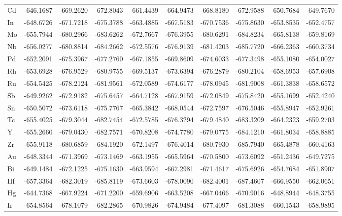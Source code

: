 \begin{table}[h]
{\begin{tabular}{*{10}{l}}
      Cd	& -646.1687	&-669.2620  &-672.8043	&-661.4439	&-664.9473	&-668.8180  &-672.9588	&-650.7684	&-649.7670 \\
      In	& -648.6726	&-671.7218	&-675.3788	&-663.4885	&-667.5183	&-670.7536	&-675.8630  &-653.8535	&-652.4757 \\
      Mo	& -655.7944	&-680.2966	&-683.6262	&-672.7667	&-676.3955	&-680.6291	&-684.8234	&-665.8138	&-659.8169 \\
      Nb	& -656.0277	&-680.8814	&-684.2662	&-672.5576	&-676.9139	&-681.4203	&-685.7720  &-666.2363	&-660.3734 \\
      Pd	& -652.2091	&-675.3967	&-677.2760  &-667.1855	&-669.8609	&-674.6033	&-677.3498	&-655.1080  &-654.0027 \\
      Rh	& -653.6928	&-676.9529	&-680.9755	&-669.5137	&-673.6394	&-676.2879	&-680.2104	&-658.6953	&-657.6908 \\
      Ru	& -654.5425	&-678.2124	&-681.9561	&-672.0589	&-674.6177	&-678.0945	&-681.9008	&-661.3838	&-658.6572 \\
      Sb	& -649.9262	&-672.9182	&-675.6457	&-664.7128	&-667.9159	&-672.0849	&-675.8420 	&-655.1699	&-652.4240 \\
      Sn	& -650.5072	&-673.6118	&-675.7767	&-665.3842	&-668.0544	&-672.7597	&-676.5046	&-655.8947	&-652.9261 \\
      Tc	& -655.4025	&-679.3044	&-682.7454	&-672.5785	&-676.3294	&-679.4840  &-683.3209	&-664.2323	&-659.2703 \\
      Y	  & -655.2660 &-679.0430	&-682.7571	&-670.8208	&-674.7780  &-679.0775	&-684.1210  &-661.8034	&-658.8885 \\
      Zr	& -655.9118	&-680.6859	&-684.1920  &-672.1497	&-676.4014	&-680.7930  &-685.7940  &-665.4878	&-660.4163 \\
      Au	& -648.3344	&-671.3969	&-673.1469	&-663.1955	&-665.5964	&-670.5800	&-673.6092	&-651.2436	&-649.7275 \\
      Bi	& -649.1484	&-672.1225	&-675.1630  &-663.9594	&-667.2981	&-671.4617	&-675.6926	&-654.7684	&-651.8907 \\
      Hf	& -657.3364	&-682.3019	&-685.8119	&-673.6603	&-678.0090  &-682.4001	&-687.4607	&-666.9550  &-662.0651 \\
      Hg	& -644.7368	&-667.9224	&-671.2200	&-659.6906	&-663.5208	&-667.0466	&-670.9016	&-648.8944	&-648.3755 \\
      Ir	& -654.8564	&-678.1079	&-682.2865	&-670.9826	&-674.9484	&-677.4097	&-681.3088	&-660.1543	&-658.9895 \\

\end{tabular}}
\end{table}
